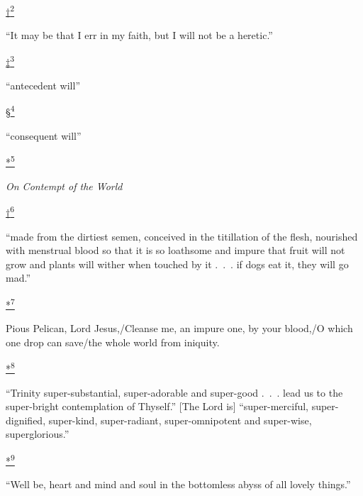 \protect\hypertarget{23_NOTES.xhtmlux5cux23id_2586}{\protect\hyperlink{17_Chapter_Ten__THE_FAILURE_OF_IMAG.xhtmlux5cux23id_2585}{†\textsuperscript{2}}}
``It may be that I err in my faith, but I will not be a heretic.''

\protect\hypertarget{23_NOTES.xhtmlux5cux23id_2588}{\protect\hyperlink{17_Chapter_Ten__THE_FAILURE_OF_IMAG.xhtmlux5cux23id_2587}{‡\textsuperscript{3}}}
``antecedent will''

\protect\hypertarget{23_NOTES.xhtmlux5cux23id_2590}{\protect\hyperlink{17_Chapter_Ten__THE_FAILURE_OF_IMAG.xhtmlux5cux23id_2589}{§\textsuperscript{4}}}
``consequent will''

\protect\hypertarget{23_NOTES.xhtmlux5cux23id_2330}{\protect\hyperlink{17_Chapter_Ten__THE_FAILURE_OF_IMAG.xhtmlux5cux23id_2329}{*\textsuperscript{5}}}
\emph{On Contempt of the World}

\protect\hypertarget{23_NOTES.xhtmlux5cux23id_2332}{\protect\hyperlink{17_Chapter_Ten__THE_FAILURE_OF_IMAG.xhtmlux5cux23id_2331}{†\textsuperscript{6}}}
``made from the dirtiest semen, conceived in the titillation of the
flesh, nourished with menstrual blood so that it is so loathsome and
impure that fruit will not grow and plants will wither when touched by
it .~.~. if dogs eat it, they will go mad.''

\protect\hypertarget{23_NOTES.xhtmlux5cux23id_2592}{\protect\hyperlink{17_Chapter_Ten__THE_FAILURE_OF_IMAG.xhtmlux5cux23id_2591}{*\textsuperscript{7}}}
Pious Pelican, Lord Jesus,/Cleanse me, an impure one, by your blood,/O
which one drop can save/the whole world from iniquity.

\protect\hypertarget{23_NOTES.xhtmlux5cux23id_2594}{\protect\hyperlink{17_Chapter_Ten__THE_FAILURE_OF_IMAG.xhtmlux5cux23id_2593}{*\textsuperscript{8}}}
``Trinity super-substantial, super-adorable and super-good .~.~. lead us
to the super-bright contemplation of Thyself.'' {[}The Lord is{]}
``super-merciful, super-dignified, super-kind, super-radiant,
super-omnipotent and super-wise, superglorious.''

\protect\hypertarget{23_NOTES.xhtmlux5cux23id_2596}{\protect\hyperlink{17_Chapter_Ten__THE_FAILURE_OF_IMAG.xhtmlux5cux23id_2595}{*\textsuperscript{9}}}
``Well be, heart and mind and soul in the bottomless abyss of all lovely
things.''

